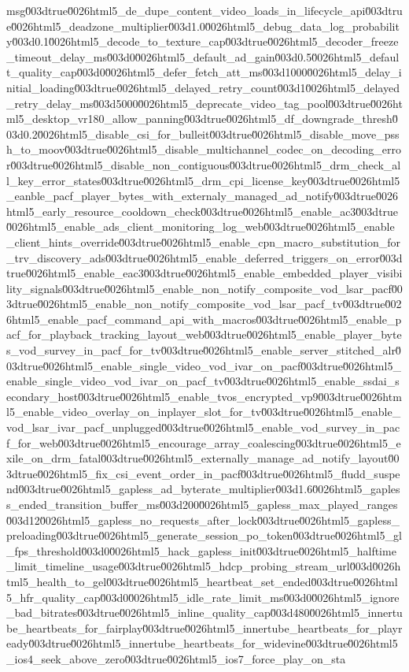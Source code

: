 {msg\u003dtrue\u0026html5_de_dupe_content_video_loads_in_lifecycle_api\u003dtrue\u0026html5_deadzone_multiplier\u003d1.0\u0026html5_debug_data_log_probability\u003d0.1\u0026html5_decode_to_texture_cap\u003dtrue\u0026html5_decoder_freeze_timeout_delay_ms\u003d0\u0026html5_default_ad_gain\u003d0.5\u0026html5_default_quality_cap\u003d0\u0026html5_defer_fetch_att_ms\u003d1000\u0026html5_delay_initial_loading\u003dtrue\u0026html5_delayed_retry_count\u003d1\u0026html5_delayed_retry_delay_ms\u003d5000\u0026html5_deprecate_video_tag_pool\u003dtrue\u0026html5_desktop_vr180_allow_panning\u003dtrue\u0026html5_df_downgrade_thresh\u003d0.2\u0026html5_disable_csi_for_bulleit\u003dtrue\u0026html5_disable_move_pssh_to_moov\u003dtrue\u0026html5_disable_multichannel_codec_on_decoding_error\u003dtrue\u0026html5_disable_non_contiguous\u003dtrue\u0026html5_drm_check_all_key_error_states\u003dtrue\u0026html5_drm_cpi_license_key\u003dtrue\u0026html5_eanble_pacf_player_bytes_with_externaly_managed_ad_notify\u003dtrue\u0026html5_early_resource_cooldown_check\u003dtrue\u0026html5_enable_ac3\u003dtrue\u0026html5_enable_ads_client_monitoring_log_web\u003dtrue\u0026html5_enable_client_hints_override\u003dtrue\u0026html5_enable_cpn_macro_substitution_for_trv_discovery_ads\u003dtrue\u0026html5_enable_deferred_triggers_on_error\u003dtrue\u0026html5_enable_eac3\u003dtrue\u0026html5_enable_embedded_player_visibility_signals\u003dtrue\u0026html5_enable_non_notify_composite_vod_lsar_pacf\u003dtrue\u0026html5_enable_non_notify_composite_vod_lsar_pacf_tv\u003dtrue\u0026html5_enable_pacf_command_api_with_macros\u003dtrue\u0026html5_enable_pacf_for_playback_tracking_layout_web\u003dtrue\u0026html5_enable_player_bytes_vod_survey_in_pacf_for_tv\u003dtrue\u0026html5_enable_server_stitched_alr\u003dtrue\u0026html5_enable_single_video_vod_ivar_on_pacf\u003dtrue\u0026html5_enable_single_video_vod_ivar_on_pacf_tv\u003dtrue\u0026html5_enable_ssdai_secondary_host\u003dtrue\u0026html5_enable_tvos_encrypted_vp9\u003dtrue\u0026html5_enable_video_overlay_on_inplayer_slot_for_tv\u003dtrue\u0026html5_enable_vod_lsar_ivar_pacf_unplugged\u003dtrue\u0026html5_enable_vod_survey_in_pacf_for_web\u003dtrue\u0026html5_encourage_array_coalescing\u003dtrue\u0026html5_exile_on_drm_fatal\u003dtrue\u0026html5_externally_manage_ad_notify_layout\u003dtrue\u0026html5_fix_csi_event_order_in_pacf\u003dtrue\u0026html5_fludd_suspend\u003dtrue\u0026html5_gapless_ad_byterate_multiplier\u003d1.6\u0026html5_gapless_ended_transition_buffer_ms\u003d200\u0026html5_gapless_max_played_ranges\u003d12\u0026html5_gapless_no_requests_after_lock\u003dtrue\u0026html5_gapless_preloading\u003dtrue\u0026html5_generate_session_po_token\u003dtrue\u0026html5_gl_fps_threshold\u003d0\u0026html5_hack_gapless_init\u003dtrue\u0026html5_halftime_limit_timeline_usage\u003dtrue\u0026html5_hdcp_probing_stream_url\u003d\u0026html5_health_to_gel\u003dtrue\u0026html5_heartbeat_set_ended\u003dtrue\u0026html5_hfr_quality_cap\u003d0\u0026html5_idle_rate_limit_ms\u003d0\u0026html5_ignore_bad_bitrates\u003dtrue\u0026html5_inline_quality_cap\u003d480\u0026html5_innertube_heartbeats_for_fairplay\u003dtrue\u0026html5_innertube_heartbeats_for_playready\u003dtrue\u0026html5_innertube_heartbeats_for_widevine\u003dtrue\u0026html5_ios4_seek_above_zero\u003dtrue\u0026html5_ios7_force_play_on_sta}
